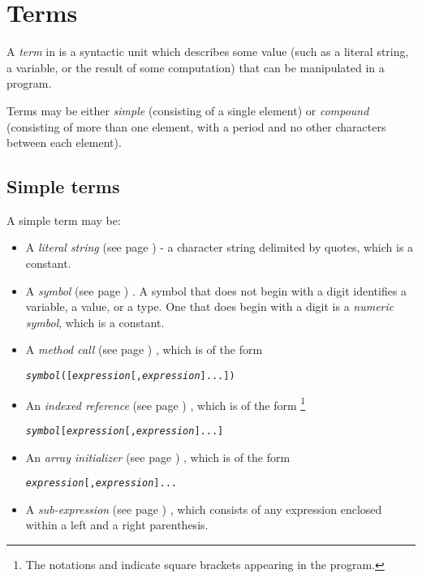 \chapter{Terms}\label{refterms}
 
A \emph{term} in \nr{} is a syntactic unit which describes some
value (such as a literal string, a variable, or the result of some
computation) that can be manipulated in a \nr{} program.
 
Terms may be either \emph{simple} (consisting of a single element) or
\emph{compound} (consisting of more than one element, with a period
and no other characters between each element).
\section{Simple terms}\label{refsimterm}
 A simple term may be:
\begin{itemize}
\item A  \emph{literal string} (see page \pageref{refxstr})  - a character string
delimited by quotes, which is a constant.
\item A  \emph{symbol} (see page \pageref{refsyms}) .
A symbol that does not begin with a digit identifies a variable, a
value, or a type.
One that does begin with a digit is a \emph{numeric symbol}, which is
a constant.
\item A  \emph{method call} (see page \pageref{refmethcon}) , which is of the form
\begin{alltt}
\emph{symbol}([\emph{expression}[,\emph{expression}]...])
\end{alltt}
\item An  \emph{indexed reference} (see page \pageref{refinstr}) , which is of the form
\footnote{
The notations \keyword{'['} and \keyword{']'}
indicate square brackets appearing in the \nr{} program.
}
\begin{alltt}
\emph{symbol}\keyword{'['}[\emph{expression}[,\emph{expression}]...]\keyword{']'}
\end{alltt}
\item An  \emph{array initializer} (see page \pageref{refarrin}) , which is of the form
\begin{alltt}
\keyword{'['}\emph{expression}[,\emph{expression}]...\keyword{']'}
\end{alltt}
\item A  \emph{sub-expression} (see page \pageref{refpreced}) , which consists of any
expression enclosed within a left and a right parenthesis.
\end{itemize}

